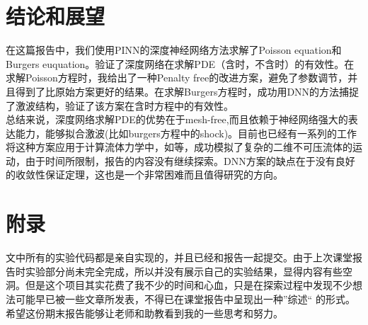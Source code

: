 \documentclass{article}
\begin{document}
\section{结论和展望}
在这篇报告中，我们使用PINN\cite{PINN}的深度神经网络方法求解了Poisson equation和Burgers euquation。验证了深度网络在求解PDE（含时，不含时）的有效性。在求解Poisson方程时，我给出了一种Penalty free的改进方案，避免了参数调节，并且得到了比原始方案更好的结果。在求解Burgers方程时，成功用DNN的方法捕捉了激波结构，验证了该方案在含时方程中的有效性。
\\
总结来说，深度网络求解PDE的优势在于mesh-free,而且依赖于神经网络强大的表达能力，能够拟合激波(比如burgers方程中的shock)。目前也已经有一系列的工作将这种方案应用于计算流体力学中，如\cite{NS-PINN}等，成功模拟了复杂的二维不可压流体的运动，由于时间所限制，报告的内容没有继续探索。DNN方案的缺点在于没有良好的收敛性保证定理，这也是一个非常困难而且值得研究的方向。

\section{附录}
文中所有的实验代码都是亲自实现的，并且已经和报告一起提交。由于上次课堂报告时实验部分尚未完全完成，所以并没有展示自己的实验结果，显得内容有些空洞。但是这个项目其实花费了我不少的时间和心血，只是在探索过程中发现不少想法可能早已被一些文章所发表，不得已在课堂报告中呈现出一种”综述“
的形式。希望这份期末报告能够让老师和助教看到我的一些思考和努力。




\medskip

\small
\end{document}
